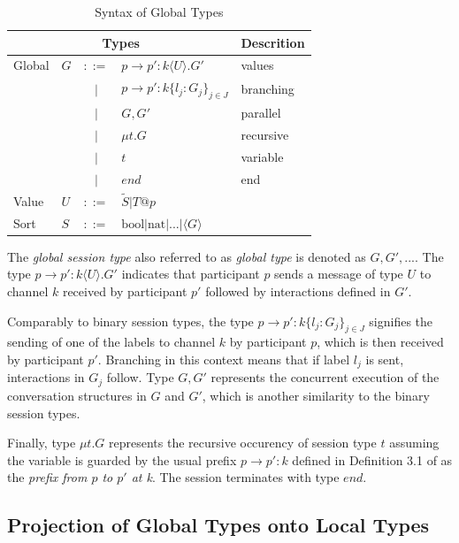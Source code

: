 \begin{table}[H]
\center
\caption{Syntax of Global Types}
\begin{tabular}{|l|l c l|l|}
  \hline  
  \multicolumn{4}{|c|}{Types} 																	&	Descrition \\
  \hline  
  Global &	$G$ &	$::=$	& $p \rightarrow p' : k \langle U \rangle . G'$ 					& 	values	 	\\
  		 &		&	$|$		& $p \rightarrow p' : k \lbrace l_{j}:G_{j} \rbrace _{j \in J} $ 	& 	branching 	\\
  		 &		&	$|$		& $G,G' $ 															& 	parallel 	\\
  		 &		&	$|$		& $\mu t.G $ 														& 	recursive 	\\
  		 &		&	$|$		& $t$ 																& 	variable 	\\
  		 &		&	$|$		& $end$ 															& 	end		 	\\
  Value	 &	$U$ &	$::=$	& $\tilde{S} | T@p $							 					& 			 	\\
  Sort	 &	$S$ &	$::=$	& $ \text{bool} | \text{nat} | \text{...} | \langle G \rangle $		& 			 	\\	  
  \hline
\end{tabular}
\label{TBglobtypesynt}
\end{table}

The \textit{global session type} also referred to as \textit{global type} is denoted as $G,G',...$. The type  $p \rightarrow p' : k \langle U \rangle . G'$ indicates that participant $p$ sends a message of type $U$ to channel $k$ received by participant $p'$ followed by interactions defined in $G'$. 

Comparably to binary session types, the type $p \rightarrow p' : k \lbrace l_{j}:G_{j} \rbrace _{j \in J} $ signifies the sending of one of the labels to channel $k$ by participant $p$, which is then received by participant $p'$. Branching in this context means that if label $l_{j}$ is sent, interactions in $G_{j}$ follow.
Type $G, G'$ represents the concurrent execution of the conversation structures in $G$ and $G'$, which is another similarity to the binary session types.

Finally, type $\mu t.G $ represents the recursive occurency of session type $t$ assuming the variable is guarded by the usual prefix $p \rightarrow p' : k $ defined in Definition 3.1 of \cite{multiparty_sess_types} as the \textit{prefix from $p$ to $p'$ at k}. The session terminates with type $end$.

\subsection{Projection of Global Types onto Local Types}

